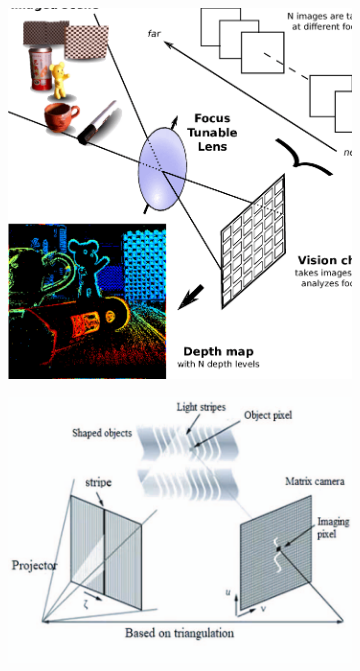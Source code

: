 \begin{figure}[htbp]
    \hfill
    \begin{subfigure}[b]{0.18\textwidth}
        \includegraphics[width=\textwidth]{images/methodology/depth_estimation_c.png}
        \caption{}
        \label{fig:depth_estimation_c}
    \end{subfigure}
    \hfill
    \begin{subfigure}[b]{0.18\textwidth}
        \includegraphics[width=\textwidth]{images/methodology/depth_estimation_d.png}

\end{subfigure}
\end{figure}
